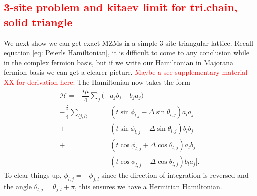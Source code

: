 \documentclass[aps,prb,showpacs,amsmath,amssymb,superscriptaddress]{revtex4-2}
\newcommand{\Red}[1]{\textcolor{red}{#1}}
\newcommand{\ham}{\mathcal{H}}
\newcommand{\de}{\Delta}
\begin{document}
\subsection{\Red{3-site problem and kitaev limit for tri.chain, solid triangle}}
We next show we can get exact MZMs in a simple 3-site triangular lattice.
Recall equation \ref{eq: Peierls Hamiltonian}, it is difficult to come to any conclusion while in the complex fermion basis, but if we write our Hamiltonian in Majorana fermion basis we can get a clearer picture.
\Red{Maybe a see supplementary material XX for derivation here.}
The Hamiltonian now takes the form
\begin{align}
  \ham = -\dfrac{i\mu}{4} \sum_j (& a_j b_j - b_j a_j) \nonumber \\
  -\dfrac{i}{4} \sum_{\langle j,l \rangle} [&(t\sin\phi_{l.j}-\de\sin\theta_{l,j}) a_l a_j \nonumber \\
  +&(t\sin\phi_{l,j}+\de\sin\theta_{l,j}) b_l b_j \nonumber \\
  +&(t\cos\phi_{l,j}+\de\cos\theta_{l,j}) a_l b_j \nonumber \\
  -&(t\cos\phi_{l,j}-\de\cos\theta_{l,j}) b_l a_j].
\end{align}
To clear things up, $\phi_{l,j} = -\phi_{j,l}$ since the direction of integration is reversed and the angle $\theta_{l,j} = \theta_{j,l} + \pi$, this ensures we have a Hermitian Hamiltonian.
\end{document}

